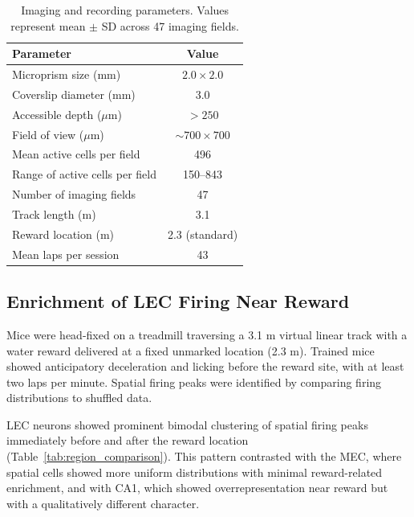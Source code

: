 \documentclass[11pt]{article}
\begin{document}
\begin{table}[H]
\centering
\caption{Imaging and recording parameters. Values represent mean $\pm$ SD across 47 imaging fields.}
\label{tab:imaging_params}
\begin{tabular}{lc}
\toprule
\textbf{Parameter} & \textbf{Value} \\
\midrule
Microprism size (mm) & $2.0 \times 2.0$ \\
Coverslip diameter (mm) & 3.0 \\
Accessible depth ($\mu$m) & $> 250$ \\
Field of view ($\mu$m) & $\sim 700 \times 700$ \\
Mean active cells per field & 496 \\
Range of active cells per field & 150--843 \\
Number of imaging fields & 47 \\
Track length (m) & 3.1 \\
Reward location (m) & 2.3 (standard) \\
Mean laps per session & 43 \\
\bottomrule
\end{tabular}
\end{table}

\subsection{Enrichment of LEC Firing Near Reward}

Mice were head-fixed on a treadmill traversing a 3.1 m virtual linear track with a water reward delivered at a fixed unmarked location (2.3 m). Trained mice showed anticipatory deceleration and licking before the reward site, with at least two laps per minute. Spatial firing peaks were identified by comparing firing distributions to shuffled data.

LEC neurons showed prominent bimodal clustering of spatial firing peaks immediately before and after the reward location (Table~\ref{tab:region_comparison}). This pattern contrasted with the MEC, where spatial cells showed more uniform distributions with minimal reward-related enrichment, and with CA1, which showed overrepresentation near reward but with a qualitatively different character.
\end{document}
